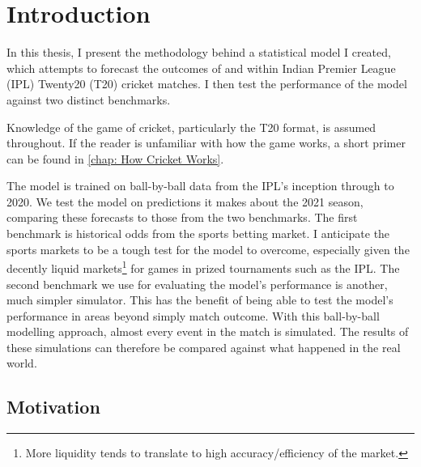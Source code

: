 \newcommand{\hsp}{\hspace{20pt}}
\titleformat{\chapter}[hang]{\Huge\bfseries}{\thechapter\hsp\textcolor{gray75}{|}\hsp}{0pt}{\Huge\bfseries}
\chapter{Introduction}


In this thesis, I present the methodology behind a statistical model I created, which attempts to forecast the outcomes of and within\footnotemark{} Indian Premier League (IPL) Twenty20 (T20) cricket matches. I then test the performance of the model against two distinct benchmarks.


Knowledge of the game of cricket, particularly the T20 format, is assumed throughout. If the reader is unfamiliar with how the game works, a short primer can be found in \cref{chap: How Cricket Works}.

The model is trained on ball-by-ball data from the IPL's inception through to 2020. We test the model on predictions it makes about the 2021 season, comparing these forecasts to those from the two benchmarks. The first benchmark is historical odds from the sports betting market. I anticipate the sports markets to be a tough test for the model to overcome, especially given the decently liquid markets\footnote{More liquidity tends to translate to high accuracy/efficiency of the market.} for games in prized tournaments such as the IPL. The second benchmark we use for evaluating the model's performance is another, much simpler simulator. This has the benefit of being able to test the model's performance in areas beyond simply match outcome. With this ball-by-ball modelling approach, almost every event in the match is simulated. The results of these simulations can therefore be compared against what happened in the real world.

\section{Motivation}

